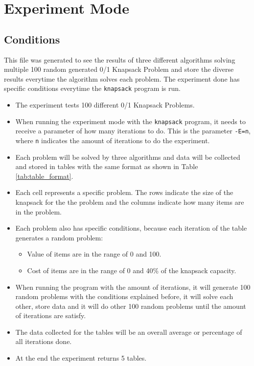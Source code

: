 \chapter*{Experiment Mode}
\section*{Conditions}
This file was generated to see the results of three different algorithms solving multiple 100 random generated 0/1 Knapsack Problem and 
store the diverse results everytime the algorithm solves each problem. The experiment done has specific conditions everytime the \verb|knapsack| 
program is run.

\begin{itemize}
    \item The experiment tests 100 different 0/1 Knapsack Problems.
    \item When running the experiment mode with the \verb|knapsack| program, it needs to receive a parameter of how many iterations to do. This
    is the parameter \verb|-E=n|, where \verb|n| indicates the amount of iterations to do the experiment.
    \item Each problem will be solved by three algorithms and data will be collected and stored in tables with the same format 
    as shown in Table \ref{tab:table_format}.
    \item Each cell represents a specific problem. The rows indicate the size of the knapsack for the the problem and the columns
    indicate how many items are in the problem.
    \item Each problem also has specific conditions, because each iteration of the table generates a random problem:
        \begin{itemize}
            \item Value of items are in the range of 0 and 100.
            \item Cost of items are in the range of 0 and 40\% of the knapsack capacity.
        \end{itemize}
    \item When running the program with the amount of iterations, it will generate 100 random problems with the conditions explained before,
    it will solve each other, store data and it will do other 100 random problems until the amount of iterations are satisfy.
    \item The data collected for the tables will be an overall average or percentage of all iterations done.
    \item At the end the experiment returns 5 tables.

\end{itemize}
